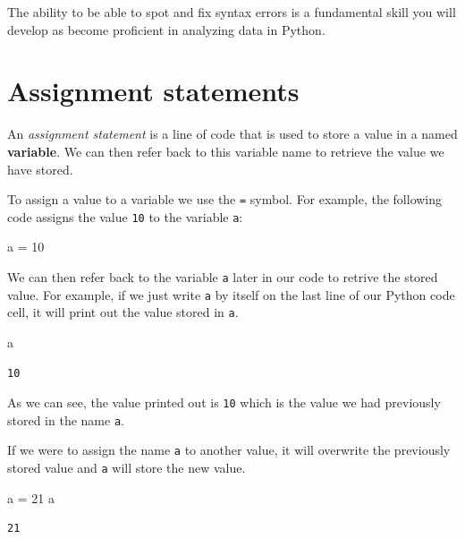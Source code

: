 \documentclass[
  letterpaper,
  DIV=11,
  numbers=noendperiod]{scrreprt}
\newenvironment{Shaded}{\begin{snugshade}}{\end{snugshade}}
\newcommand{\DecValTok}[1]{\textcolor[rgb]{0.68,0.00,0.00}{#1}}
\newcommand{\NormalTok}[1]{\textcolor[rgb]{0.00,0.23,0.31}{#1}}
\newcommand{\OperatorTok}[1]{\textcolor[rgb]{0.37,0.37,0.37}{#1}}
\begin{document}
The ability to be able to spot and fix syntax errors is a fundamental
skill you will develop as become proficient in analyzing data in Python.

\section{Assignment statements}\label{assignment-statements}

An \emph{assignment statement} is a line of code that is used to store a
value in a named \textbf{variable}. We can then refer back to this
variable name to retrieve the value we have stored.

To assign a value to a variable we use the \texttt{=} symbol. For
example, the following code assigns the value \texttt{10} to the
variable \texttt{a}:

\begin{Shaded}
\begin{Highlighting}[]
\NormalTok{a }\OperatorTok{=} \DecValTok{10}
\end{Highlighting}
\end{Shaded}

We can then refer back to the variable \texttt{a} later in our code to
retrive the stored value. For example, if we just write \texttt{a} by
itself on the last line of our Python code cell, it will print out the
value stored in \texttt{a}.

\begin{Shaded}
\begin{Highlighting}[]
\NormalTok{a}
\end{Highlighting}
\end{Shaded}

\begin{verbatim}
10
\end{verbatim}

As we can see, the value printed out is \texttt{10} which is the value
we had previously stored in the name \texttt{a}.

If we were to assign the name \texttt{a} to another value, it will
overwrite the previously stored value and \texttt{a} will store the new
value.

\begin{Shaded}
\begin{Highlighting}[]
\NormalTok{a }\OperatorTok{=} \DecValTok{21}
\NormalTok{a}
\end{Highlighting}
\end{Shaded}

\begin{verbatim}
21
\end{verbatim}
\end{document}
